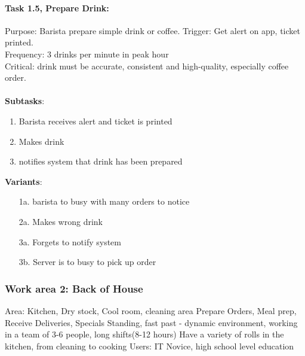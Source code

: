\documentclass{article}
\begin{document}
\paragraph{Task 1.5, Prepare Drink:}
Purpose: Barista prepare simple drink or coffee.
Trigger: Get alert on app, ticket printed.\\
Frequency: 3 drinks per minute in peak hour\\
Critical: drink must be accurate, consistent and high-quality, especially coffee order.\\
\\
\textbf{Subtasks}:
\begin{enumerate}
    \item Barista receives alert and ticket is printed
    \item Makes drink
    \item notifies system that drink has been prepared
\end{enumerate}
\textbf{Variants}:
\begin{enumerate}
    \item [1a.] barista to busy with many orders to notice
    \item [2a.] Makes wrong drink
    \item [3a.] Forgets to notify system
    \item [3b.] Server is to busy to pick up order
\end{enumerate}

\clearpage
\subsubsection{Work area 2: Back of House}
Area: Kitchen, Dry stock, Cool room, cleaning area
Prepare Orders, Meal prep, Receive Deliveries, Specials
Standing, fast past - dynamic environment, working in a team of 3-6 people, long shifts(8-12 hours)
Have a variety of rolls in the kitchen, from cleaning to cooking
Users: IT Novice, high school level education
\end{document}
